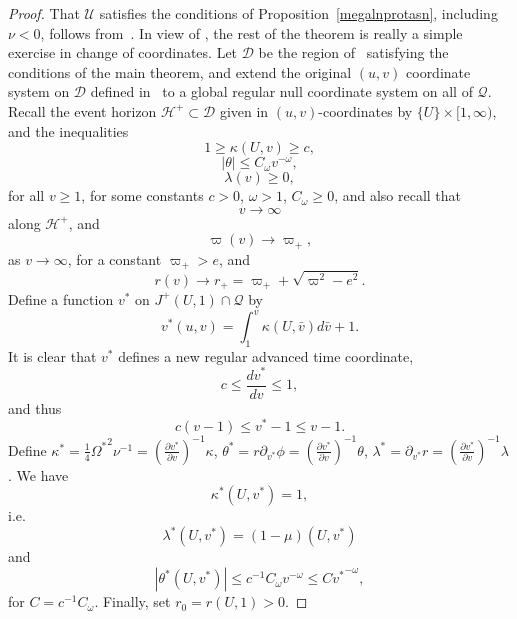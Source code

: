 \documentclass{article}
\begin{document}
\begin{proof}
That $\mathcal{U}$ satisfies the conditions of Proposition~\ref{megalnprotasn},
including $\nu<0$,
follows from~\cite{md:sssts}.
In view of \cite{chge:givp}, the rest of the theorem
is really a simple exercise in change of coordinates.
Let $\mathcal{D}$ be the
region of~\cite{mi:mazi} satisfying
the conditions of the main theorem, and extend the original $(u,v)$
coordinate system on $\mathcal{D}$ defined in~\cite{mi:mazi}
to a global regular
null coordinate system on all of $\mathcal{Q}$. Recall
the event horizon $\mathcal{H}^+\subset\mathcal{D}$ 
given in $(u,v)$-coordinates by $\{U\}\times[1,\infty)$,
and the inequalities
\[
1\ge\kappa(U,v)\ge c,
\]
\[
|\theta|\le C_\omega v^{-\omega},
\]
\[
\lambda(v)\ge 0,
\]
for all $v\ge 1$, for some constants $c>0$, $\omega>1$, 
$C_\omega\ge 0$, and also recall that
\[
v\to\infty
\]
along $\mathcal{H}^+$,
and
\begin{equation}
\label{mazaorio}
\varpi(v)\to \varpi_+,
\end{equation}
as $v\to\infty$,
for a constant $\varpi_+>e$, and 
\begin{equation}
\label{r--orio}
r(v)\to r_+=\varpi_++\sqrt{\varpi^2-e^2}.
\end{equation}
Define a function $v^*$ on $J^+(U,1)\cap\mathcal{Q}$
by 
\[
v^*(u,v)=\int_1^v\kappa(U,\bar{v})d\bar{v}+1.
\]
It is clear that $v^*$ defines a new regular advanced time coordinate,
\[
c\le \frac{d {v^*}}{d v}\le 1,
\]
and thus
\[
c(v-1)\le{v^*}-1\le v-1.
\]
Define 
$\kappa^*=\frac14{\Omega^*}^2\nu^{-1}=
\left(\frac{\partial {v^*}}{\partial v}\right)^{-1}\kappa$,
$\theta^*=r\partial_{v^*}\phi=\left(\frac{\partial {v^*}}{\partial v}\right)^{-1}\theta$,
$\lambda^*=\partial_{v^*}r=\left(\frac{\partial {v^*}}{\partial v}\right)^{-1}\lambda$.
We have
\begin{equation}
\label{eiv1}
\kappa^*(U,v^*)=1,
\end{equation}
i.e.~
\begin{equation}
\label{eiv1*}
\lambda^*(U,v^*)=(1-\mu)(U,v^*)
\end{equation}
and
\begin{equation}
\label{apotoallo9}
|\theta^*(U,v^*)|\le c^{-1}C_\omega v^{-\omega}\le C{v^*}^{-\omega},
\end{equation}
for $C=c^{-1}C_\omega$. 
Finally, set $r_0=r(U,1)>0$.


\end{proof}
\end{document}
